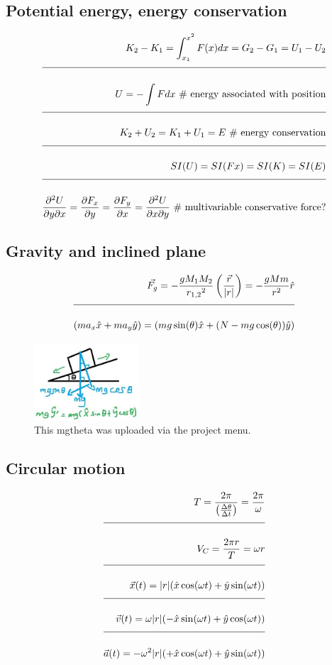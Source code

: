 \documentclass[a4paper]{article}
\newcommand{\eqComment}[1]{\text{  \# #1}}
\newcommand{\n}{\\[1.5ex] \hline \nonumber \\[0ex]}
\begin{document}
\subsection{Potential energy, energy conservation}
\begin{tcolorbox}
\begin{align}
   K_2 - K_1 = \int_{x_1}^{x^2} F(x) dx = G_2 - G_1 = U_1 - U_2
\n U = - \int F dx \eqComment{energy associated with position}
\n K_2 + U_2 = K_1 + U_1 = E \eqComment{energy conservation}
\n SI(U) = SI(F x) = SI(K) = SI(E)
\n \frac{\partial^2 U}{\partial y \partial x} = \frac{\partial F_x}{\partial y} = \frac{\partial F_y}{\partial x} = \frac{\partial^2 U}{\partial x \partial y} \eqComment{multivariable conservative force?}
\end{align}
\end{tcolorbox}

\subsection{Gravity and inclined plane}
\begin{tcolorbox}
\begin{align}
   \vec{F_g} = -\frac{g M_1 M_2}{{r_{1,2}}^2} \left(\frac{\vec{r}}{|r|}\right) = -\frac{g M m}{{r}^2} \hat{r}
\n (m a_x \hat{x} + m a_y \hat{y}) = (m g \sin(\theta) \hat{x} + (N - m g \cos(\theta))\hat{y})
\end{align}
\end{tcolorbox}

\begin{figure}[h]
\centering
\includegraphics[width=0.35\textwidth]{figures/mgtheta.jpg}
\caption{\label{fig:mgtheta}This mgtheta was uploaded via the project menu.}
\end{figure} \FloatBarrier

\subsection{Circular motion}
\begin{tcolorbox}
\begin{align}
   T = \frac{2 \pi}{\left(\frac{\Delta \theta}{\Delta t}\right)} = \frac{2 \pi}{\omega}
\n V_C = \frac{2 \pi r}{T} = \omega r
\n \vec{x}(t) = |r| (\hat{x} \cos(\omega t) + \hat{y} \sin(\omega t))
\n \vec{v}(t) = \omega |r| (-\hat{x} \sin(\omega t) + \hat{y} \cos(\omega t))
\n \vec{a}(t) = -\omega^2 |r| (+\hat{x} \cos(\omega t) + \hat{y} \sin(\omega t))
\end{align}
\end{tcolorbox}
\end{document}
